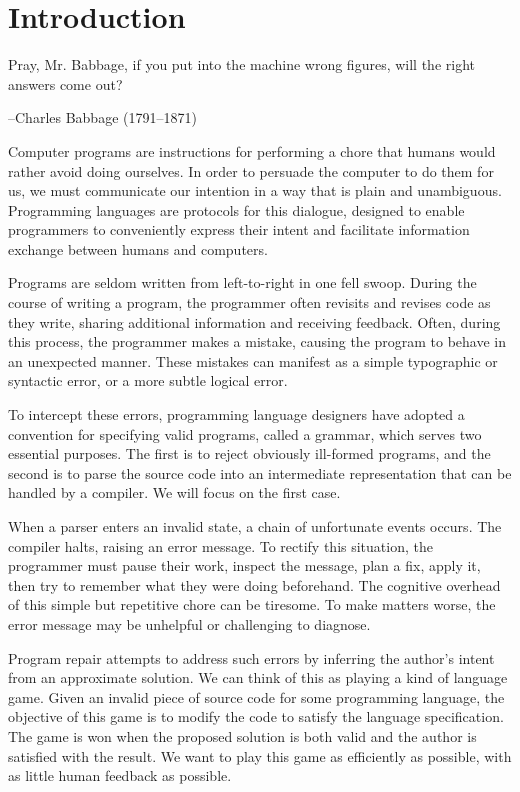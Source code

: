 \chapter{\rm\bfseries Introduction}
\label{ch:introduction}

\epigraph{Pray, Mr. Babbage, if you put into the machine wrong figures, will the right answers come out?}{--Charles Babbage (1791--1871)}


Computer programs are instructions for performing a chore that humans would rather avoid doing ourselves. In order to persuade the computer to do them for us, we must communicate our intention in a way that is plain and unambiguous. Programming languages are protocols for this dialogue, designed to enable programmers to conveniently express their intent and facilitate information exchange between humans and computers.

Programs are seldom written from left-to-right in one fell swoop. During the course of writing a program, the programmer often revisits and revises code as they write, sharing additional information and receiving feedback. Often, during this process, the programmer makes a mistake, causing the program to behave in an unexpected manner. These mistakes can manifest as a simple typographic or syntactic error, or a more subtle logical error.

To intercept these errors, programming language designers have adopted a convention for specifying valid programs, called a grammar, which serves two essential purposes. The first is to reject obviously ill-formed programs, and the second is to parse the source code into an intermediate representation that can be handled by a compiler. We will focus on the first case.

When a parser enters an invalid state, a chain of unfortunate events occurs. The compiler halts, raising an error message. To rectify this situation, the programmer must pause their work, inspect the message, plan a fix, apply it, then try to remember what they were doing beforehand. The cognitive overhead of this simple but repetitive chore can be tiresome. To make matters worse, the error message may be unhelpful or challenging to diagnose.

Program repair attempts to address such errors by inferring the author's intent from an approximate solution. We can think of this as playing a kind of language game. Given an invalid piece of source code for some programming language, the objective of this game is to modify the code to satisfy the language specification. The game is won when the proposed solution is both valid and the author is satisfied with the result. We want to play this game as efficiently as possible, with as little human feedback as possible.

